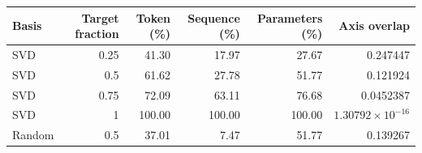 \begin{center}\small
\begin{tabular}{@{}lrrrrr@{}}
\toprule
Basis & Target fraction & Token (\%) & Sequence (\%) & Parameters (\%) & Axis overlap \\
\midrule
SVD & 0.25 & 41.30 & 17.97 & 27.67 & 0.247447 \\
SVD & 0.5 & 61.62 & 27.78 & 51.77 & 0.121924 \\
SVD & 0.75 & 72.09 & 63.11 & 76.68 & 0.0452387 \\
SVD & 1 & 100.00 & 100.00 & 100.00 & $1.30792\times 10^{-16}$ \\
Random & 0.5 & 37.01 & 7.47 & 51.77 & 0.139267 \\
\bottomrule
\end{tabular}
\end{center}
